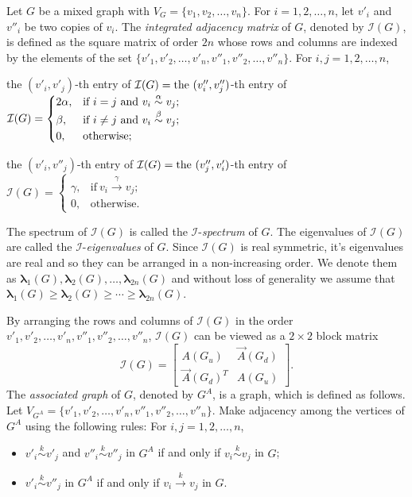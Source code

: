 \documentclass[12pt]{article}
\numberwithin{equation}{section}
\newtheorem{defn}{Definition}[section]
\begin{document}
		Let $G$ be a mixed graph with $V_G=\{v_1,v_2,\ldots,v_n\}$. For $i=1,2,\ldots,n$, let $v'_i$ and $v''_i$ be two copies of $v_i$. The \textit{integrated adjacency matrix} of $G$, denoted by $\mathcal{I}(G)$, is defined as the square matrix of order $2n$ whose rows and columns are indexed by the elements of the set $\{v'_1,v'_2,\ldots,v'_n,v''_1,v''_2,\ldots,v''_n\}$.
		For $i,j=1,2,\ldots,n$,
		
		the $(v'_i,v'_j)$-th entry of $\mathcal{I}(G)=\textnormal{the }(v''_i,v''_j)$-th entry of $\mathcal{I}(G)=\begin{cases}
			2\alpha, & \text{if}~i= j\textnormal{ and}~ v_{i}\overset{\alpha}{\sim} v_{j};\\
			\beta, & \text{if}~i\neq j\textnormal{ and}~ v_{i}\overset{\beta}{\sim} v_{j};\\
			0, & \text{otherwise};
		\end{cases}$
		
		the $(v'_i,v''_j)$-th entry of $\mathcal{I}(G)=\textnormal{the }(v''_j,v'_i)$-th entry of $\mathcal{I}(G)=\begin{cases}
			\gamma, & \text{if}~ v_{i}\overset{\gamma}{\rightarrow} v_{j};\\
			0, & \text{otherwise}.
		\end{cases}$	
	
	The spectrum of $\mathcal{I}(G)$ is called the $\mathcal{I}$-\textit{spectrum} of $G$. The eigenvalues of $\mathcal{I}(G)$ are called the $\mathcal{I}$-\textit{eigenvalues} of $G$. Since $\mathcal{I}(G)$ is real symmetric, it's eigenvalues are real and so they can be arranged in a non-increasing order. We denote them as $\bm{\lambda}_1(G),\bm{\lambda}_2(G),\ldots,\bm{\lambda}_{2n}(G)$  and without loss of generality we assume that $\bm{\lambda}_1(G)\geq\bm{\lambda}_2(G)\geq\cdots\geq\bm{\lambda}_{2n}(G)$.
	
	By arranging the rows and columns of $\mathcal{I}(G)$ in the order 
	$v'_1,v'_2,\ldots,v'_n,v''_1,v''_2,\ldots,v''_n$,
	$\mathcal{I}(G)$ can be viewed as a $2\times 2$ block matrix 
	\begin{equation}\label{adjmatrix block}
		\mathcal{I}(G)=\begin{bmatrix}
			A(G_u) & \vec{A}(G_d)\\
			\vec{A}(G_d)^T & A(G_u)
		\end{bmatrix}.
	\end{equation}
	The \emph{associated graph} of $G$, denoted by $G^A$, is a graph, which is defined as follows.
	Let $V_{G^A}=\{v'_1,v'_2,\ldots,v'_n,v''_1,v''_2,\ldots,v''_n\}$. Make adjacency among the vertices of $G^A$ using the following rules: For $i,j=1,2,\ldots,n$,
	\begin{itemize}
		\item[(i)] $v'_i\overset{k}{\sim} v'_j$ and $v''_i\overset{k}{\sim} v''_j$ in $G^A$ if and only if $v_i\overset{k}{\sim} v_j$ in $G$;
		\item[(ii)] $v'_i\overset{k}{\sim} v''_j$ in $G^A$ if and only if $v_i\overset{k}{\rightarrow} v_j$ in $G$.
	\end{itemize}
	
\end{document}
